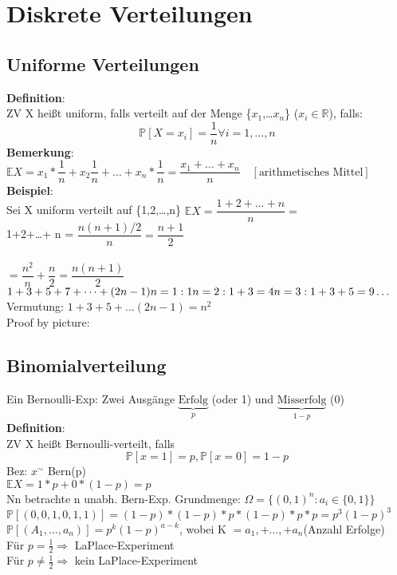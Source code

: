 \chapter{Diskrete Verteilungen}
\section{Uniforme Verteilungen}
\textbf{Definition}:\\
ZV X heißt uniform, falls verteilt auf der Menge \{$x_1$,\dots$x_n$\} ($x_i \in \mathds{R}$), falls: 
$$\mathds{P}[X=x_i] = \dfrac{1}{n} \forall i = 1,\dots,n$$
\textbf{Bemerkung}: $\mathds{E}X= x_1*\dfrac{1}{n}+x_2\dfrac{1}{n}+\dots + x_n *\dfrac{1}{n} = \dfrac{x_1+\dots+x_n}{n} \quad [\text{arithmetisches Mittel}]$\medskip\\
\textbf{Beispiel}:\\
Sei X uniform verteilt auf \{1,2,\dots,n\} $\mathds{E}X=\dfrac{1+2+\dots+n}{n}=$\smallskip\\
1+2+\dots + n = $\dfrac{n(n+1)/2}{n}=\dfrac{n+1}{2}$ \\
\\
$=\dfrac{n^2}{n}+\dfrac{n}{2}=\dfrac{n(n+1)}{2}$\medskip\\
\begin{math}
1 + 3 + 5 + 7 + \dots + (2n-1)\\
n = 1: 1\\
n = 2: 1+3=4\\
n = 3: 1 + 3 + 5 = 9\\
\dots
\end{math}
Vermutung: $1 + 3 + 5 + \dots (2n-1) = n^2$\\
Proof by picture:\\
\section{Binomialverteilung}
Ein Bernoulli-Exp: Zwei Ausgänge $\underbrace{\text{Erfolg}}_p$ (oder 1) und $\underbrace{\text{Misserfolg}}_{1-p}$ (0)\medskip\\
\textbf{Definition}:\\
ZV X heißt Bernoulli-verteilt, falls 
$$\mathds{P}[x=1]=p,\mathds{P}[x=0]=1-p$$
Bez: $x^\sim$ Bern(p)\\
$\mathds{E}X=1*p+0*(1-p)=p$\smallskip\\
Nn betrachte n unabh. Bern-Exp. Grundmenge: $\Omega =\{(0,1)^n:a_i \in \{0,1\}\}$\smallskip\\
$\mathds{P}[(0,0,1,0,1,1)]=(1-p)*(1-p)*p*(1-p)*p*p = p^3(1-p)^3$\smallskip\\
$\mathds{P}[(A_1,\dots,a_n)]= p^k(1-p)^{a-k}$, wobei K $= a_1,+\dots,+a_n $(Anzahl Erfolge)\medskip\\
Für $p=\frac{1}{2} \Rightarrow$ LaPlace-Experiment\\
Für $p \neq \frac{1}{2} \Rightarrow$ kein LaPlace-Experiment
